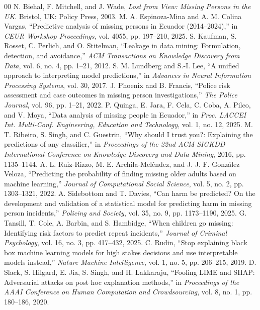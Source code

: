 \documentclass[conference]{IEEEtran}
\begin{document}
\begin{thebibliography}{00}
 N. Biehal, F. Mitchell, and J. Wade, \emph{Lost from View: Missing Persons in the UK}. Bristol, UK: Policy Press, 2003.
 M. A. Espinoza-Mina and A. M. Colina Vargas, ``Predictive analysis of missing persons in Ecuador (2014--2024),'' in \emph{CEUR Workshop Proceedings}, vol. 4055, pp. 197--210, 2025.
 S. Kaufman, S. Rosset, C. Perlich, and O. Stitelman, ``Leakage in data mining: Formulation, detection, and avoidance,'' \emph{ACM Transactions on Knowledge Discovery from Data}, vol. 6, no. 4, pp. 1--21, 2012.
 S. M. Lundberg and S.-I. Lee, ``A unified approach to interpreting model predictions,'' in \emph{Advances in Neural Information Processing Systems}, vol. 30, 2017.
 J. Phoenix and B. Francis, ``Police risk assessment and case outcomes in missing person investigations,'' \emph{The Police Journal}, vol. 96, pp. 1--21, 2022.
 P. Quinga, E. Jara, F. Cela, C. Coba, A. Pilco, and V. Moya, ``Data analysis of missing people in Ecuador,'' in \emph{Proc. LACCEI Int. Multi-Conf. Engineering, Education and Technology}, vol. 1, no. 12, 2025.
 M. T. Ribeiro, S. Singh, and C. Guestrin, ``Why should I trust you?: Explaining the predictions of any classifier,'' in \emph{Proceedings of the 22nd ACM SIGKDD International Conference on Knowledge Discovery and Data Mining}, 2016, pp. 1135--1144.
 A. L. Ruiz-Rizzo, M. E. Archila-Mel\'{e}ndez, and J. J. F. Gonz\'{a}lez Veloza, ``Predicting the probability of finding missing older adults based on machine learning,'' \emph{Journal of Computational Social Science}, vol. 5, no. 2, pp. 1303--1321, 2022.
 A. Sidebottom and T. Davies, ``Can harm be predicted? On the development and validation of a statistical model for predicting harm in missing person incidents,'' \emph{Policing and Society}, vol. 35, no. 9, pp. 1173--1190, 2025.
 G. Tansill, T. Cole, A. Barbin, and S. Hambidge, ``When children go missing: Identifying risk factors to predict repeat incidents,'' \emph{Journal of Criminal Psychology}, vol. 16, no. 3, pp. 417--432, 2025.
 C. Rudin, ``Stop explaining black box machine learning models for high stakes decisions and use interpretable models instead,'' \emph{Nature Machine Intelligence}, vol. 1, no. 5, pp. 206--215, 2019.
 D. Slack, S. Hilgard, E. Jia, S. Singh, and H. Lakkaraju, ``Fooling LIME and SHAP: Adversarial attacks on post hoc explanation methods,'' in \emph{Proceedings of the AAAI Conference on Human Computation and Crowdsourcing}, vol. 8, no. 1, pp. 180--186, 2020.

\end{thebibliography}
\end{document}

